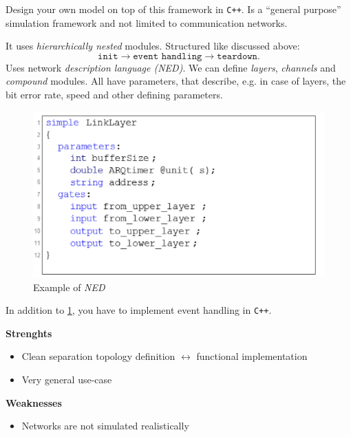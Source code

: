 \documentclass[english]{panikzettel}
\begin{document}
	\begin{halfboxl}
		Design your own model on top of this framework in \texttt{C++}.
		Is a \enquote{general purpose} simulation framework and not limited to communication networks. 
		
		It uses \textit{hierarchically nested} modules.
		Structured like discussed above: 	
		\[
			 \texttt{init}\rightarrow\texttt{event handling}\rightarrow\texttt{teardown}.
		\]
		Uses network \textit{description language (NED)}.	
		We can define \textit{layers}, \textit{channels} and \textit{compound} modules.
		All have parameters, that describe, e.g. in case of layers, the bit error rate, speed and other defining parameters.
	\end{halfboxl}%
	\begin{halfboxr}
		\vspace{-\baselineskip}
		\begin{figure}[H]
			\centering
			\includegraphics[width=\textwidth]{img/5-ned.png}
			\caption{Example of \textit{NED}}
			\label{img-5-ned}
		\end{figure}
	\end{halfboxr}

	In addition to \cref{img-5-ned}, you have to implement event handling in \texttt{C++}. 
	
	\begin{halfboxl}
		\textbf{Strenghts} \\
		\begin{itemize}
			\item Clean separation topology definition \( \leftrightarrow \) functional implementation
			\item Very general use-case
		\end{itemize}
	\end{halfboxl}%
	\begin{halfboxr}
		\vspace{-\baselineskip}
		\textbf{Weaknesses}\\
		\begin{itemize}
			\item Networks are not simulated realistically 
		\end{itemize}
	\end{halfboxr}
\end{document}
